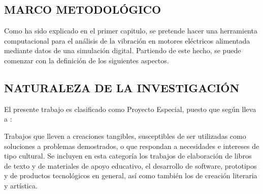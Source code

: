 
\begin{center}
	\section{MARCO METODOLÓGICO}
\end{center}


Como ha sido explicado en el primer capitulo, se pretende hacer una herramienta computacional para el análisis de la vibración en motores eléctricos alimentada mediante datos de una simulación digital. Partiendo de este hecho, se puede comenzar con la definición de los siguientes aspectos.\\


\subsection{NATURALEZA DE LA INVESTIGACIÓN}

El presente trabajo es clasificado como Proyecto Especial, puesto que según  \textcite{Hernandez} lleva a :\\
\begin{center}
	\parbox[ht]{13.5 cm}{Trabajos que lleven a creaciones tangibles, susceptibles de ser utilizadas como soluciones a problemas demostrados, o que respondan a necesidades e intereses de tipo cultural. Se incluyen en esta categoría los trabajos de elaboración de libros de texto y de materiales de apoyo educativo, el desarrollo de software, prototipos y de productos tecnológicos en general, así como también los de creación literaria y artística.}
\end{center}

